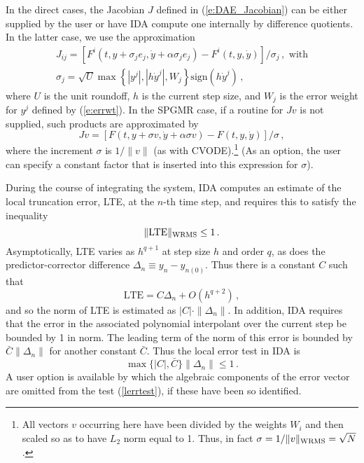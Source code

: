 In the direct cases, the Jacobian $J$ defined in (\ref{e:DAE_Jacobian}) 
can be either supplied by the user or have IDA compute one internally 
by difference quotients. In the latter case, we use the approximation
\begin{gather*}
  J_{ij} = [F^i(t,y+\sigma_j e_j,{\dot y}+\alpha\sigma_j e_j) - 
            F^i(t,y,{\dot y})]/\sigma_j \, , \text{ with}\\
  \sigma_j = \sqrt{U} \max \left\{ |y^j|, |h{\dot y}^j|,W_j \right\}
             \mbox{sign}(h {\dot y}^j) \, ,
\end{gather*}
where $U$ is the unit roundoff, $h$ is the current step size, and $W_j$ is 
the error weight for $y^j$ defined by (\ref{e:errwt}).
In the SPGMR case, if a routine for $Jv$ is not supplied, such products are
approximated by
\begin{equation*}
Jv = [F(t,y+\sigma v,{\dot y}+\alpha\sigma v) - F(t,y,{\dot y})]/\sigma \, ,
\end{equation*}
where the increment $\sigma$ is $1/\|v\|$ (as with
CVODE).\footnote{All vectors $v$ occurring here have been divided by
the weights $W_i$ and then scaled so as to have $L_2$ norm equal to 1.
Thus, in fact $\sigma = 1/\|v\|_{\mbox{\scriptsize WRMS}}=\sqrt{N}$.}
(As an option, the user can specify a constant factor that is inserted
into this expression for $\sigma$).

During the course of integrating the system, IDA computes an estimate
of the local truncation error, LTE, at the $n$-th time step, and
requires this to satisfy the inequality
\begin{equation*}
  \| \mbox{LTE} \|_{\mbox{\scriptsize WRMS}} \leq 1 \, .               
\end{equation*}
Asymptotically, LTE varies as $h^{q+1}$ at step size $h$ and order $q$, as
does the predictor-corrector difference $\Delta_n \equiv y_n-y_{n(0)}$.  
Thus there is a constant $C$ such that
\[ \mbox{LTE} = C \Delta_n + O(h^{q+2}) \, , \]
and so the norm of LTE is estimated as $|C| \cdot \|\Delta_n\|$.
In addition, IDA requires that the error in the associated polynomial
interpolant over the current step be bounded by 1 in norm.  The
leading term of the norm of this error is bounded by
$\bar{C} \|\Delta_n\|$ for another constant $\bar{C}$.  Thus the local
error test in IDA is
\begin{equation}\label{lerrtest}
   \max\{ |C|, \bar{C} \} \|\Delta_n\| \leq 1 \, .
\end{equation}
A user option is available by which the algebraic components of the
error vector are omitted from the test (\ref{lerrtest}), if these have
been so identified.

